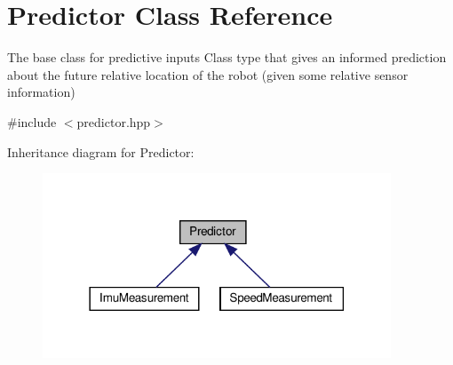 \hypertarget{classPredictor}{}\section{Predictor Class Reference}
\label{classPredictor}


The base class for predictive inputs Class type that gives an informed prediction about the future relative location of the robot (given some relative sensor information)  




{\ttfamily \#include $<$predictor.\+hpp$>$}



Inheritance diagram for Predictor\+:
\nopagebreak
\begin{figure}[H]
\begin{center}
\leavevmode
\includegraphics[width=294pt]{classPredictor__inherit__graph}
\end{center}
\end{figure}
